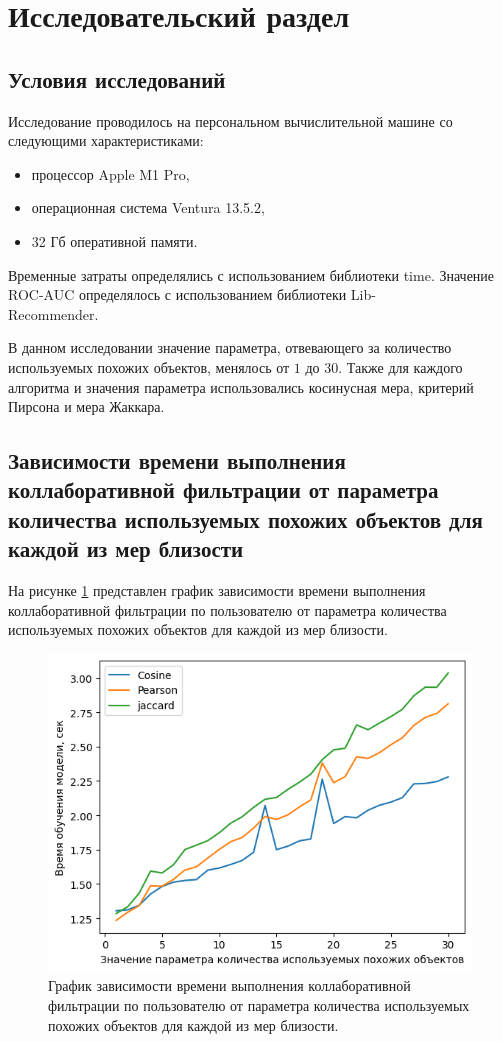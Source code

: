 \section{Исследовательский раздел}
\subsection{Условия исследований}
Исследование проводилось на персональном вычислительной машине со следующими характеристиками:

\begin{itemize}
\item процессор Apple M1 Pro,
\item операционная система Ventura 13.5.2,
\item 32 Гб оперативной памяти.
\end{itemize}

Временные затраты определялись с использованием библиотеки time. Значение ROC-AUC определялось с использованием библиотеки Lib-\\Recommender.

В данном исследовании значение параметра, отвевающего за количество используемых похожих объектов, менялось от $1$ до $30$. Также для каждого алгоритма и значения параметра использовались косинусная мера, критерий Пирсона и мера Жаккара.

\subsection{Зависимости времени выполнения коллаборативной фильтрации от параметра количества используемых похожих объектов для каждой из мер близости}

На рисунке \ref{img:time1} представлен график зависимости времени выполнения коллаборативной фильтрации по пользователю от параметра количества используемых похожих объектов для каждой из мер близости.

\begin{figure}[H]
	\centering
	\includegraphics[width=\textwidth]{inc/timesUser.png}
	\caption{ График зависимости времени выполнения коллаборативной фильтрации по пользователю от параметра количества используемых похожих объектов для каждой из мер близости.}
	\label{img:time1}
\end{figure}

